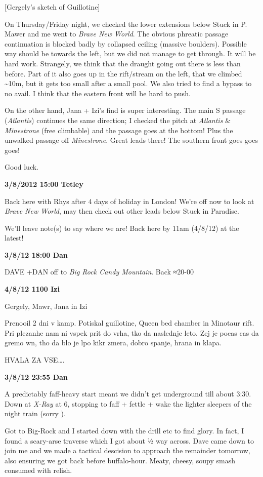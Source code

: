 {[}Gergely's sketch of Guillotine{]}

On Thursday/Friday night, we checked the lower extensions below Stuck in
P. Mawer and me went to \emph{Brave New World}. The obvious phreatic
passage continuation is blocked badly by collapsed ceiling (massive
boulders). Possible way should be towards the left, but we did not
manage to get through. It will be hard work. Strangely, we think that
the draught going out there is less than before. Part of it also goes up
in the rift/stream on the left, that we climbed \textasciitilde{}10m,
but it gets too small after a small pool. We also tried to find a bypass
to no avail. I think that the eastern front will be hard to push.

On the other hand, Jana + Izi's find is super interesting. The main S
passage (\emph{Atlantis}) continues the same direction; I checked the
pitch at \emph{Atlantis} \& \emph{Minestrone} (free climbable) and the
passage goes at the bottom! Plus the unwalked passage off
\emph{Minestrone}. Great leads there! The southern front goes goes goes!

Good luck.

\textbf{3/8/2012 15:00 Tetley}

Back here with Rhys after 4 days of holiday in London! We're off now to
look at \emph{Brave New World}, may then check out other leads below
Stuck in Paradise.

We'll leave note(s) to say where we are! Back here by 11am (4/8/12) at
the latest!

\textbf{3/8/12 18:00 Dan}

DAVE +DAN off to \emph{Big Rock Candy Mountain}. Back ≈20-00

\textbf{4/8/12 1100 Izi}

Gergely, Mawr, Jana in Izi

Prenooil 2 dni v kamp. Potiskal guillotine, Queen bed chamber in
Minotaur rift. Pri plezanhe nam ni vspek prit do vrha, tko da naslednje
leto. Zej je pocas cas da gremo wn, tho da blo je lpo kikr zmera, dobro
spanje, hrana in klapa.

HVALA ZA VSE\ldots{}.

\textbf{3/8/12 23:55 Dan}

A predictably faff-heavy start meant we didn't get underground till
about 3:30. Down at \emph{X-Ray} at 6, stopping to faff + fettle + wake
the lighter sleepers of the night train (sorry ).

Got to Big-Rock and I started down with the drill etc to find glory. In
fact, I found a scary-arse traverse which I got about ½ way across. Dave
came down to join me and we made a tactical descision to approach the
remainder tomorrow, also ensuring we got back before buffalo-hour.
Meaty, cheesy, soupy smash consumed with relish.

